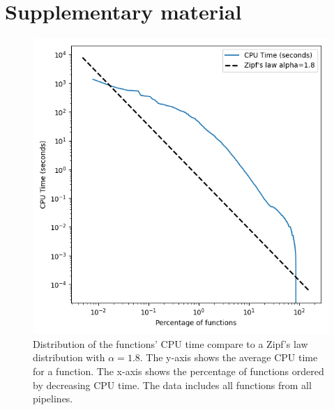 \documentclass[conference]{IEEEtran}
\begin{document}
\section*{Supplementary material}
\begin{figure}
	\centering
	\includegraphics{figures/global-zipf_law.png}
	\caption{Distribution of the functions' CPU time compare to a Zipf's law distribution with $\alpha=1.8$. The y-axis shows the average CPU time for a function. The x-axis shows the percentage of functions ordered by decreasing CPU time. The data includes all functions from all pipelines.}
	\label{sup-fig:zips-law}
\end{figure}



\label{sec:supplementary}
										
\newcommand{\csvtable}[3]{
	\begin{table}[h]
		\resizebox*{\textwidth}{!}{
			\csvreader[hotspot]{#1}{}
			{\thecsvrow & \module & \func & \tablenum[round-precision=2, round-mode=places]{\mean}$\pm$\tablenum[round-precision=2, round-mode=places]{\std}}
		}
		\caption{#2}
		\label{#3}
	\end{table}
}
										
\end{document}
